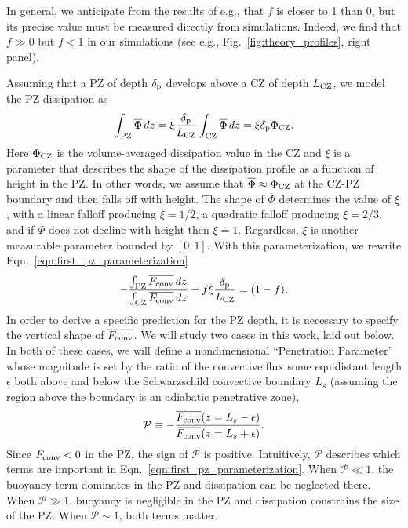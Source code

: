 \documentclass[twocolumn]{aastex631}
\newcommand{\delp}{\ensuremath{\delta_{\rm{p}}}}
\newcommand{\Fconv}{\ensuremath{F_{\rm{conv}}}}
\newcommand{\mP}{\ensuremath{\mathcal{P}}}
\renewcommand{\bar}[1]{\overline{#1}}
\begin{document}
In general, we anticipate from the results of e.g., \citet{currie_browning_2017} that $f$ is closer to 1 than 0, but its precise value must be measured directly from simulations.
Indeed, we find that $f \gg 0$ but $f < 1$ in our simulations (see e.g., Fig.~\ref{fig:theory_profiles}, right panel).

Assuming that a PZ of depth $\delp$ develops above a CZ of depth $L_{\rm{CZ}}$, we model the PZ dissipation as
\begin{equation}
\int_{\rm{PZ}} \bar{\Phi}\,dz = \xi\frac{\delp}{L_{\rm{CZ}}}\int_{\rm{CZ}}\bar{\Phi}\,dz = \xi \delp \Phi_{\rm{CZ}}.
\label{eqn:xi_defn}
\end{equation}
Here $\Phi_{\rm{CZ}}$ is the volume-averaged dissipation value in the CZ and $\xi$ is a parameter that describes the shape of the dissipation profile as a function of height in the PZ.
In other words, we assume that $\bar{\Phi} \approx \Phi_{\rm{CZ}}$ at the CZ-PZ boundary and then falls off with height.
The shape of $\bar{\Phi}$ determines the value of $\xi$, with a linear falloff producing $\xi = 1/2$, a quadratic falloff producing $\xi = 2/3$, and if $\bar{\Phi}$ does not decline with height then $\xi = 1$.
Regardless, $\xi$ is another measurable parameter bounded by $[0, 1]$. 
With this parameterization, we rewrite Eqn.~\ref{eqn:first_pz_parameterization}
\begin{equation}
-\frac{\int_{\rm{PZ}}\bar{\Fconv}\,dz}{\int_{\rm{CZ}}\bar{\Fconv}\,dz} + f\xi\frac{\delp}{L_{\rm{CZ}}}
= (1 - f).
\label{eqn:theory_fraction}
\end{equation}
In order to derive a specific prediction for the PZ depth, it is necessary to specify the vertical shape of $\overline{\Fconv}$.
We will study two cases in this work, laid out below.
In both of these cases, we will define a nondimensional ``Penetration Parameter'' whose magnitude is set by the ratio of the convective flux some equidistant length $\epsilon$ both above and below the Schwarzschild convective boundary $L_s$ (assuming the region above the boundary is an adiabatic penetrative zone),
\begin{equation}
\mP \equiv -\frac{\overline{\Fconv}(z = L_s - \epsilon)}{\overline{\Fconv}(z = L_s + \epsilon)}.
\label{eqn:theory_P_defn}
\end{equation}
Since $\Fconv < 0$ in the PZ, the sign of $\mP$ is positive.
Intuitively, $\mP$ describes which terms are important in Eqn.~\ref{eqn:first_pz_parameterization}.
When $\mP \ll 1$, the buoyancy term dominates in the PZ and dissipation can be neglected there.
When $\mP \gg 1$, buoyancy is negligible in the PZ and dissipation constrains the size of the PZ.
When $\mP \sim 1$, both terms matter.
\end{document}
